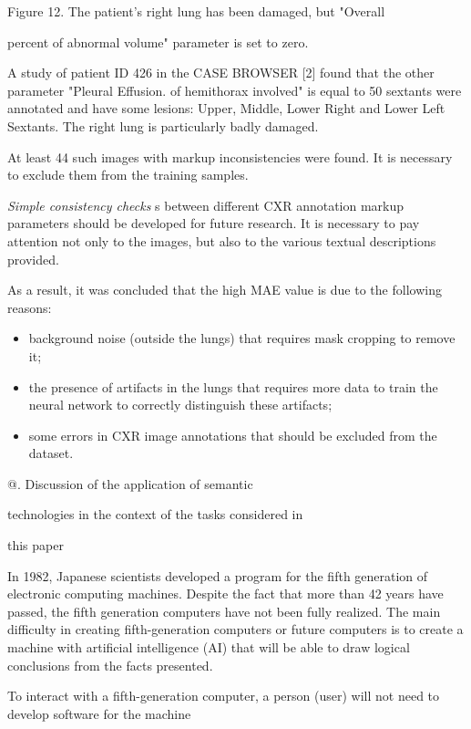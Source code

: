 \documentclass[a4paper]{article}
\makeatletter
\newcommand*{\rom}[1]{\expandafter\@slowromancap\romannumeral #1@}
\makeatother
\begin{document}
\begin{multicols}{2}
Figure 12. The patient’s right lung has been damaged, but "Overall\par
percent of abnormal volume" parameter is set to zero.\\
\par
\normalsize
A study of patient ID 426 in the CASE BROWSER [2]
found that the other parameter "Pleural Effusion. %
of hemithorax involved" is equal to 50 %
sextants were annotated and have some lesions: Upper,
Middle, Lower Right and Lower Left Sextants. The right
lung is particularly badly damaged.\par
At least 44 such images with markup inconsistencies
were found. It is necessary to exclude them from the
training samples.\par
\textit{Simple consistency checks}
s between different CXR annotation markup parameters should be developed for
future research. It is necessary to pay attention not only
to the images, but also to the various textual descriptions
provided.\par
As a result, it was concluded that the high MAE value
is due to the following reasons:
\begin{itemize}[noitemsep]%
\item background noise (outside the lungs) that requires
mask cropping to remove it;
\item the presence of artifacts in the lungs that requires
more data to train the neural network to correctly
distinguish these artifacts;
\item some errors in CXR image annotations that should
be excluded from the dataset.
\end{itemize}

\centerline{\rom{7}. Discussion of the application of semantic}
technologies in the context of the tasks considered in
\centerline{this paper}\par
In 1982, Japanese scientists developed a program for
the fifth generation of electronic computing machines.
Despite the fact that more than 42 years have passed,
the fifth generation computers have not been fully realized. The main difficulty in creating fifth-generation
computers or future computers is to create a machine
with artificial intelligence (AI) that will be able to draw
logical conclusions from the facts presented.\par
To interact with a fifth-generation computer, a person
(user) will not need to develop software for the machine

\end{multicols}
\end{document}
